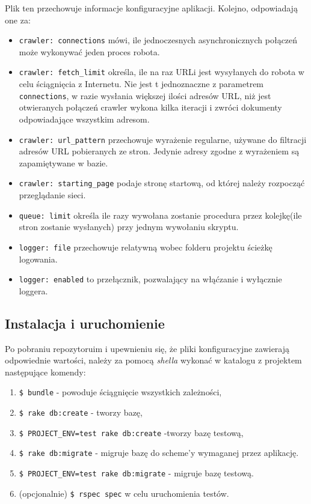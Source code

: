 Plik ten przechowuje informacje konfiguracyjne aplikacji. Kolejno, odpowiadają one za:
\begin{itemize}
\item \texttt{crawler: connections} mówi, ile jednoczesnych asynchronicznych połączeń może wykonywać jeden proces robota.
\item \texttt{crawler: fetch\_limit} określa, ile na raz URLi jest wysyłanych do robota w celu ściągnięcia z Internetu. Nie jest t jednoznaczne z parametrem \texttt{connections}, 
w razie wysłania większej ilości adresów URL, niż jest otwieranych połączeń crawler wykona kilka iteracji i zwróci dokumenty odpowiadające wszystkim adresom.
\item \texttt{crawler: url\_pattern} przechowuje wyrażenie regularne, używane do filtracji adresów URL pobieranych ze stron. Jedynie adresy zgodne z wyrażeniem są zapamiętywane w bazie.
\item \texttt{crawler: starting\_page} podaje stronę startową, od której należy rozpocząć przeglądanie sieci.
\item \texttt{queue: limit} określa ile razy wywołana zostanie procedura przez kolejkę(ile stron zostanie wysłanych) przy jednym wywołaniu skryptu.
\item \texttt{logger: file} przechowuje relatywną wobec folderu projektu ścieżkę logowania.
\item \texttt{logger: enabled} to przełącznik, pozwalający na włąćzanie i wyłącznie loggera.
\end{itemize}

\subsection{Instalacja i uruchomienie}
\label{subs:instalacjaMri}

Po pobraniu repozytoruim i upewnieniu się, że pliki konfiguracyjne zawierają odpowiednie wartości, należy za pomocą \emph{shella} wykonać w katalogu z projektem następujące komendy:
\begin{enumerate}
\item \texttt{\$ bundle} - powoduje ściągnięcie wszystkich zależności,
\item \texttt{\$ rake db:create} - tworzy bazę,
\item \texttt{\$ PROJECT\_ENV=test rake db:create} -tworzy bazę testową,
\item \texttt{\$ rake db:migrate} - migruje bazę do scheme'y wymaganej przez aplikację.
\item \texttt{\$ PROJECT\_ENV=test rake db:migrate} - migruje bazę testową.
\item (opcjonalnie) \texttt{\$ rspec spec} w celu uruchomienia testów.
\end{enumerate}

